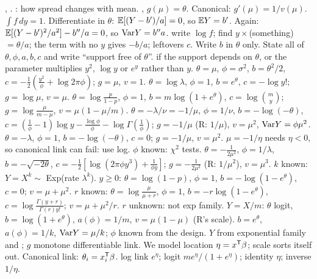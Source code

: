 \sk{}, .  : how spread changes with mean.  , $g(\mu)=\theta$. Canonical: $g'(\mu)=1/v(\mu)$.
\sk{} $\int f\,dy=1$. Differentiate in $\theta$: $\mathbb{E}[(Y-b')/a]=0$, so $\mathbb{E} Y=b'$. Again: $\mathbb{E}[(Y-b')^2/a^2]-b''/a=0$, so $\mathrm{Var} Y=b''a$.
\sk{} write $\log f$; find $y\times$(something) $=\theta/a$; the term with no $y$ gives $-b/a$; leftovers $c$. Write $b$ in $\theta$ only.  State all of $\theta,\phi,a,b,c$ and write “support free of $\theta$”.  if the support depends on $\theta$, or the parameter multiplies $y^2$, $\log y$ or $e^y$ rather than $y$.
\li{} $\theta=\mu$, $\phi=\sigma^2$, $b=\theta^2/2$, $c=-\frac12(\frac{y^2}\phi+\log2\pi\phi)$; $g=\mu$, $v=1$.
\li{} $\theta=\log\lambda$, $\phi=1$, $b=e^\theta$, $c=-\log y!$; $g=\log\mu$, $v=\mu$.
\li{} $\theta=\log\frac p{1-p}$, $\phi=1$, $b=m\log(1+e^\theta)$, $c=\log\binom my$; $g=\log\frac\mu{m-\mu}$, $v=\mu(1-\mu/m)$.
\li{} $\theta=-\lambda/\nu=-1/\mu$, $\phi=1/\nu$, $b=-\log(-\theta)$, $c=(\frac1\phi-1)\log y-\frac{\log\phi}\phi-\log\Gamma(\frac1\phi)$; $g=-1/\mu$ (R: $1/\mu$), $v=\mu^2$, $\mathrm{Var} Y=\phi\mu^2$.
\li{} $\theta=-\lambda$, $\phi=1$, $b=-\log(-\theta)$, $c=0$; $g=-1/\mu$, $v=\mu^2$. $\mu=-1/\eta$ needs $\eta<0$, so canonical link can fail: use log. $\phi$ known: $\chi^2$ tests.
\li{} $\theta=-\frac1{2\mu^2}$, $\phi=1/\lambda$, $b=-\sqrt{-2\theta}$, $c=-\frac12[\log(2\pi\phi y^3)+\frac1{\phi y}]$; $g=-\frac1{2\mu^2}$ (R: $1/\mu^2$), $v=\mu^3$.
\li{} $k$ known: $Y=X^k\sim$ Exp(rate $\lambda^k$).
\li{} $y\ge0$: $\theta=\log(1-p)$, $\phi=1$, $b=-\log(1-e^\theta)$, $c=0$; $v=\mu+\mu^2$.
\li{} $r$ known: $\theta=\log\frac\mu{\mu+r}$, $\phi=1$, $b=-r\log(1-e^\theta)$, $c=\log\frac{\Gamma(y+r)}{\Gamma(r)y!}$; $v=\mu+\mu^2/r$. $r$ unknown: not exp family.
\li{} $Y=X/m$: $\theta$ logit, $b=\log(1+e^\theta)$, $a(\phi)=1/m$, $v=\mu(1-\mu)$ (R's scale).  $b=e^\theta$, $a(\phi)=1/k$, $\mathrm{Var} Y=\mu/k$; $\phi$ known from the design.
\bx
{} $Y$ from exponential family and ; $g$ monotone differentiable link. We model location $\eta=x^{\mathsf T}\beta$; scale sorts itself out. Canonical link: $\theta_i=x_i^{\mathsf T}\beta$.
\sk{} log link $e^\eta$; logit $me^\eta/(1+e^\eta)$; identity $\eta$; inverse $1/\eta$.
